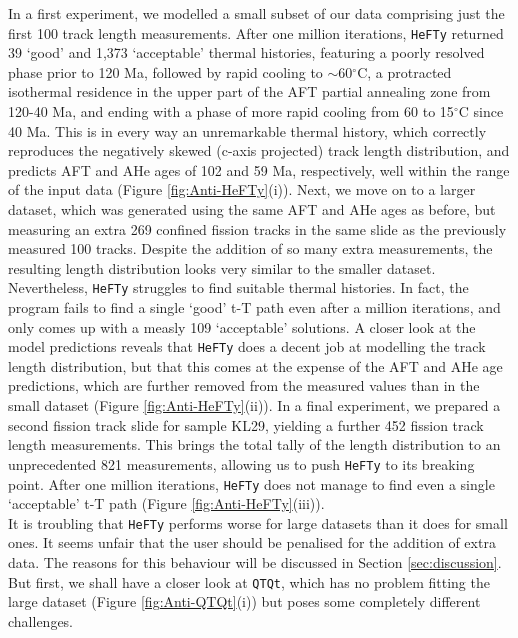 \documentclass{article}
\begin{document}
In a first experiment, we modelled a small subset of our data
comprising just the first 100 track length measurements. After one
million iterations, {\tt HeFTy} returned 39 `good' and 1,373
`acceptable' thermal histories, featuring a poorly resolved phase
prior to 120 Ma, followed by rapid cooling to $\sim$60$^\circ$C, a
protracted isothermal residence in the upper part of the AFT partial
annealing zone from 120-40 Ma, and ending with a phase of more rapid
cooling from 60 to 15$^{\circ}$C since 40 Ma. This is in every way an
unremarkable thermal history, which correctly reproduces the
negatively skewed (c-axis projected) track length distribution, and
predicts AFT and AHe ages of 102 and 59 Ma, respectively, well within
the range of the input data (Figure \ref{fig:Anti-HeFTy}(i)).  Next,
we move on to a larger dataset, which was generated using the same AFT
and AHe ages as before, but measuring an extra 269 confined fission
tracks in the same slide as the previously measured 100
tracks. Despite the addition of so many extra measurements, the
resulting length distribution looks very similar to the smaller
dataset. Nevertheless, {\tt HeFTy} struggles to find suitable thermal
histories. In fact, the program fails to find a single `good' t-T path
even after a million iterations, and only comes up with a measly 109
`acceptable' solutions. A closer look at the model predictions reveals
that {\tt HeFTy} does a decent job at modelling the track length
distribution, but that this comes at the expense of the AFT and AHe
age predictions, which are further removed from the measured values
than in the small dataset (Figure \ref{fig:Anti-HeFTy}(ii)). In a
final experiment, we prepared a second fission track slide for sample
KL29, yielding a further 452 fission track length measurements. This
brings the total tally of the length distribution to an unprecedented
821 measurements, allowing us to push {\tt HeFTy} to its breaking
point. After one million iterations, {\tt HeFTy} does not manage to
find even a single `acceptable' t-T path (Figure
\ref{fig:Anti-HeFTy}(iii)).  \\

It is troubling that {\tt HeFTy} performs worse for large datasets
than it does for small ones. It seems unfair that the user should be
penalised for the addition of extra data. The reasons for this
behaviour will be discussed in Section \ref{sec:discussion}.  But
first, we shall have a closer look at {\tt QTQt}, which has no problem
fitting the large dataset (Figure \ref{fig:Anti-QTQt}(i)) but poses
some completely different challenges.
\end{document}
